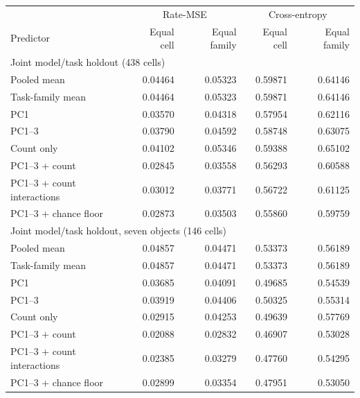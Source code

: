 \begin{tabular}{lrrrr}
\toprule
& \multicolumn{2}{c}{Rate-MSE} & \multicolumn{2}{c}{Cross-entropy}\\
Predictor & Equal cell & Equal family & Equal cell & Equal family\\
\midrule
\multicolumn{5}{l}{Joint model/task holdout (438 cells)}\\
Pooled mean & 0.04464 & 0.05323 & 0.59871 & 0.64146\\
Task-family mean & 0.04464 & 0.05323 & 0.59871 & 0.64146\\
PC1 & 0.03570 & 0.04318 & 0.57954 & 0.62116\\
PC1--3 & 0.03790 & 0.04592 & 0.58748 & 0.63075\\
Count only & 0.04102 & 0.05346 & 0.59388 & 0.65102\\
PC1--3 + count & 0.02845 & 0.03558 & 0.56293 & 0.60588\\
PC1--3 + count interactions & 0.03012 & 0.03771 & 0.56722 & 0.61125\\
PC1--3 + chance floor & 0.02873 & 0.03503 & 0.55860 & 0.59759\\
\midrule
\multicolumn{5}{l}{Joint model/task holdout, seven objects (146 cells)}\\
Pooled mean & 0.04857 & 0.04471 & 0.53373 & 0.56189\\
Task-family mean & 0.04857 & 0.04471 & 0.53373 & 0.56189\\
PC1 & 0.03685 & 0.04091 & 0.49685 & 0.54539\\
PC1--3 & 0.03919 & 0.04406 & 0.50325 & 0.55314\\
Count only & 0.02915 & 0.04253 & 0.49639 & 0.57769\\
PC1--3 + count & 0.02088 & 0.02832 & 0.46907 & 0.53028\\
PC1--3 + count interactions & 0.02385 & 0.03279 & 0.47760 & 0.54295\\
PC1--3 + chance floor & 0.02899 & 0.03354 & 0.47951 & 0.53050\\
\bottomrule
\end{tabular}
